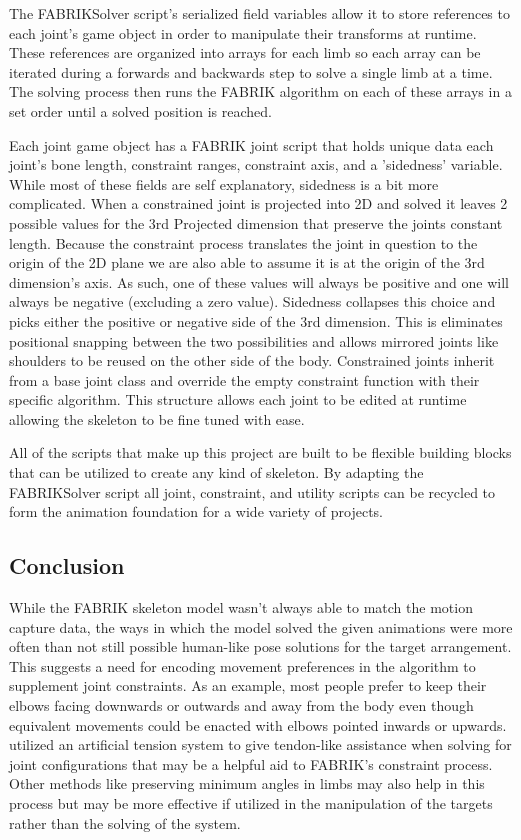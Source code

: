 \documentclass[10pt,twocolumn]{article}
\begin{document}
The FABRIKSolver script's serialized field variables allow it to store references to each joint's game object in order to manipulate their transforms at runtime. These references are organized into arrays for each limb so each array can be iterated during a forwards and backwards step to solve a single limb at a time. The solving process then runs the FABRIK algorithm on each of these arrays in a set order until a solved position is reached. 

Each joint game object has a FABRIK joint script that holds unique data each joint's bone length, constraint ranges, constraint axis, and a 'sidedness' variable. While most of these fields are self explanatory, sidedness is a bit more complicated. When a constrained joint is projected into 2D and solved it leaves 2 possible values for the 3rd Projected dimension that preserve the joints constant length. Because the constraint process translates the joint in question to the origin of the 2D plane we are also able to assume it is at the origin of the 3rd dimension's axis. As such, one of these values will always be positive and one will always be negative (excluding a zero value). Sidedness collapses this choice and picks either the positive or negative side of the 3rd dimension. This is eliminates positional snapping between the two possibilities and allows mirrored joints like shoulders to be reused on the other side of the body. Constrained joints inherit from a base joint class and override the empty constraint function with their specific algorithm. This structure allows each joint to be edited at runtime allowing the skeleton to be fine tuned with ease. 

All of the scripts that make up this project are built to be flexible building blocks that can be utilized to create any kind of skeleton. By adapting the FABRIKSolver script all joint, constraint, and utility scripts can be recycled to form the animation foundation for a wide variety of projects. 


\subsection{Conclusion}


 While the FABRIK skeleton model wasn't always able to match the motion capture data, the ways in which the model solved the given animations were more often than not still possible human-like pose solutions for the target arrangement. This suggests a need for encoding movement preferences in the algorithm to supplement joint constraints. As an example, most people prefer to keep their elbows facing downwards or outwards and away from the body even though equivalent movements could be enacted with elbows pointed inwards or upwards. \textcite{spore} utilized an artificial tension system to give tendon-like assistance when solving for joint configurations that may be a helpful aid to FABRIK's constraint process. Other methods like preserving minimum angles in limbs may also help in this process but may be more effective if utilized in the manipulation of the targets rather than the solving of the system. 
\end{document}
